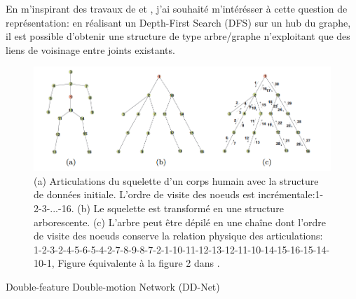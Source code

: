 En m'inspirant des travaux de \cite{liu2016spatio} et \cite{2018arXiv180110304Y}, j'ai souhaité m'intérésser à cette question de représentation: en réalisant un Depth-First Search (DFS) sur un hub du graphe, il est possible d'obtenir une structure de type arbre/graphe n'exploitant que des liens de voisinage entre joints existants.


\begin{figure}[H]
    \centering
    \includegraphics[width=1\linewidth]{Images/DFS.png}
    \caption{(a) Articulations du squelette d'un corps humain avec la structure de données initiale. L'ordre de visite des noeuds est incrémentale:1-2-3-...-16. (b) Le squelette est transformé en une structure arborescente. (c)  L'arbre peut être dépilé en une chaîne dont l'ordre de visite des noeuds conserve la relation physique des articulations: 1-2-3-2-4-5-6-5-4-2-7-8-9-8-7-2-1-10-11-12-13-12-11-10-14-15-16-15-14-10-1, Figure équivalente à la figure 2 dans  \cite{liu2016spatio}.}
    \label{fig:DFS}
\end{figure}

 Double-feature Double-motion Network (DD-Net) \cite{2019arXiv190709658Y}

